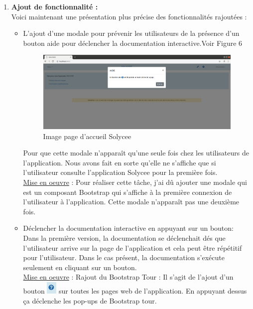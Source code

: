 \documentclass[12pt]{article}
\begin{document}
\begin{enumerate}
\item \textbf{Ajout de fonctionnalité :}\\
Voici maintenant une présentation plus précise des fonctionnalités rajoutées : 

\begin{itemize}
\item L'ajout d'une modale pour prévenir les utilisateurs de la présence d'un bouton aide pour déclencher la documentation interactive.Voir Figure 6

\begin{figure}[H]
	\centering
 		\includegraphics[width=1\textwidth]{diagrammes/aide_modal.png}
  		\caption{Image page d'accueil Solycee}
	\end{figure}
\newpage
Pour que cette modale n'apparaît qu'une seule fois chez les utilisateurs de l'application. Nous avons fait en sorte qu'elle ne s'affiche que si l'utilisateur consulte l'application Solycee pour la première fois. \\ 


\underline{Mise en oeuvre} :
Pour réaliser cette tâche, j'ai dû ajouter une modale qui est un composant Bootstrap qui s'affiche à la première connexion de l'utilisateur à l'application. Cette modale n'apparaît pas une deuxième fois. \\ 

   
\item Déclencher la documentation interactive en appuyant sur un bouton: Dans la première version, la documentation se déclenchait dés que l'utilisateur arrive sur la page de l'application et cela peut être répétitif pour l'utilisateur. Dans le cas présent, la documentation s'exécute seulement en cliquant sur un bouton. \\ 

\underline{Mise en oeuvre} :
Rajout du Bootstrap Tour : Il s'agit de l'ajout d'un bouton \includegraphics[width=5mm,scale=0.5]{diagrammes/Bouton_aideDispo.png} sur toutes les pages web de l'application. En appuyant dessus ça déclenche les pop-ups  de Bootstrap tour. 



\end{itemize}
\end{enumerate}
\end{document}
